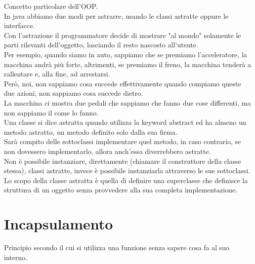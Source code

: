 \documentclass{article}
\begin{document}
Concetto particolare dell'OOP.\\
In java abbiamo due modi per astrarre, usando le classi astratte oppure le interfacce.\\
Con l'astrazione il programmatore decide di mostrare "al mondo" solamente le parti rilevanti dell'oggetto, lasciando il resto nascosto all'utente.\\
Per esempio, quando siamo in auto, sappiamo che se premiamo l'acceleratore, la macchina andrà più forte, altrimenti, se premiamo il freno, la macchina tenderà a rallentare e, alla fine, ad arrestarsi.\\
Però, noi, non sappiamo cosa succede effettivamente quando compiamo queste due azioni, non sappiamo cosa succede dietro.\\
La macchina ci mostra due pedali che sappiamo che fanno due cose differenti, ma non sappiamo il come lo fanno.\\
Una classe si dice astratta quando utilizza la keyword abstract ed ha almeno un metodo astratto, un metodo definito solo dalla sua firma.\\
Sarà compito delle sottoclassi implementare quel metodo, in caso contrario, se non dovessero implementarlo, allora anch'essa diverrebbero astratte.\\
Non è possibile instanziare, direttamente (chiamare il construttore della classe stessa), classi astratte, invece è possibile instanziarla attraverso le sue sottoclassi.\\
Lo scopo della classe astratta è quella di definire una superclasse che definisce la struttura di un oggetto senza provvedere alla sua completa implementazione.\\

\section*{Incapsulamento}

Principio secondo il cui si utilizza una funzione senza sapere cosa fa al suo interno.\\
\end{document}
